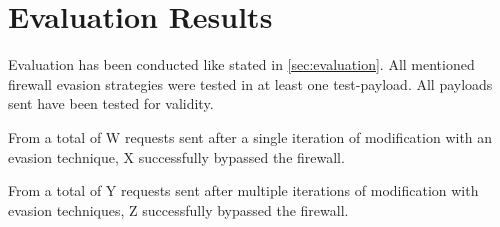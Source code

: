 \section{Evaluation Results}
\label{sec:EvaluationResults}
Evaluation has been conducted like stated in \ref{sec:evaluation}. 
All mentioned firewall evasion strategies were tested in at least one test-payload.
All payloads sent have been tested for validity.

From a total of {\color{red} W } requests sent after a single iteration of modification with an evasion technique, {\color{red} X } successfully bypassed the firewall. 

From a total of {\color{red} Y } requests sent after multiple iterations of modification with evasion techniques, {\color{red} Z } successfully bypassed the firewall. 
